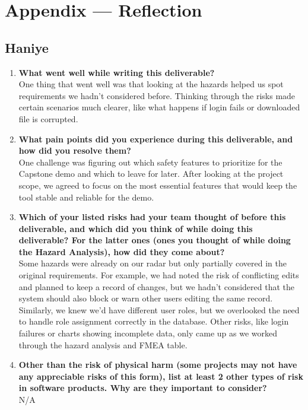 \documentclass{article}
\begin{document}
\newpage{}

\section*{Appendix --- Reflection}


\subsection*{Haniye}
\begin{enumerate}
    \item \textbf{What went well while writing this deliverable?}\\
    One thing that went well was that looking at the hazards helped us spot requirements we hadn’t considered before. Thinking through the risks made certain scenarios much clearer, like what happens if login fails or downloaded file is corrupted.
    \item \textbf{What pain points did you experience during this deliverable, and how
    did you resolve them?}\\
    One challenge was figuring out which safety features to prioritize for the Capstone demo and which to leave for later. After looking at the project scope, we agreed to focus on the most essential features that would keep the tool stable and reliable for the demo.
    \item \textbf{Which of your listed risks had your team thought of before this
    deliverable, and which did you think of while doing this deliverable? For
    the latter ones (ones you thought of while doing the Hazard Analysis), how
    did they come about?}\\
    Some hazards were already on our radar but only partially covered in the original requirements. For example, we had noted the risk of conflicting edits and planned to keep a record of changes, but we hadn’t considered that the system should also block or warn other users editing the same record. Similarly, we knew we’d have different user roles, but we overlooked the need to handle role assignment correctly in the database. Other risks, like login failures or charts showing incomplete data, only came up as we worked through the hazard analysis and FMEA table.
    \item \textbf{Other than the risk of physical harm (some projects may not have any
    appreciable risks of this form), list at least 2 other types of risk in
    software products. Why are they important to consider?} \\
    N/A
\end{enumerate}
\end{document}
